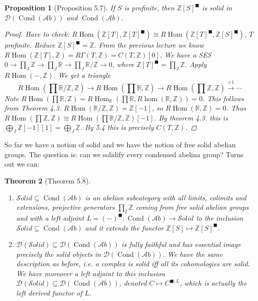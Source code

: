 \documentclass[12pt]{article}
\theoremstyle{darkgreentheorem}
\newtheorem{thm}{Theorem}[section]
\newtheorem{prop}[thm]{Proposition}
\theoremstyle{darkbluedefinition}
\theoremstyle{darkredexample}
\theoremstyle{remark}
\newcommand{\Z}{\mathbb{Z}}
\newcommand{\R}{\mathbb{R}}
\newcommand{\1}{\mathbbm{1}}
\newcommand{\Ab}{\mathscr{A}b}
\newcommand{\D}{\mathscr{D}}
\newcommand{\Solid}{\mathscr{S}olid}
\DeclareMathOperator{\Hom}{Hom}
\DeclareMathOperator{\Cond}{Cond}
\newcommand{\sub}{\subseteq}
\newcommand{\solid}{^{\blacksquare}}
\begin{document}
\begin{prop}[Proposition 5.7]
    If $S$ is profinite, then $\Z[S]\solid$ is solid in $\D(\Cond(\Ab))$ and $\Cond(\Ab)$.
    \begin{proof}
	Have to check: $R\Hom(\Z[T],\Z[T]\solid)\cong R\Hom(\Z[T]\solid,\Z[S]\solid)$, $T$ profinite.
	Reduce $\Z[S]\solid =\Z$.
	From the previous lecture we know $R\Hom(\Z[T],\Z)=R\Gamma (T,\Z)=C(T,\Z)[0]$.
	We have a SES $0\to \prod_{J}\Z\to \prod_{J}\R\to \prod_{J}\R/\Z\to 0$, where $\Z[T]\solid =\prod_{J}\Z$.
	Apply $R\Hom(-,\Z)$.
	We get a triangle
	\[R\Hom(\prod \R/\Z,\Z)\to R\Hom(\prod \R,\Z)\to R\Hom(\prod \Z,\Z)\xrightarrow{+1}\cdots\]
	Note $R\Hom(\prod \R,\Z)=R\Hom_{\R}(\prod \R, R\hom(\R,\Z))=0$.
	This follows from Theorem 4.3. $R\Hom(\R/\Z,\Z)=\Z[-1]$, so $R\Hom(\R,\Z)=0$.
	Thus $R\Hom(\prod\Z,\Z)\cong R\Hom(\prod \R/\Z,\Z)[-1]$.
	By theorem 4.3. this is $\bigoplus_{J}\Z[-1][1]=\bigoplus_{J}\Z$.
	By 5.4 this is precisely $C(T,\Z)$.
    \end{proof}
\end{prop}

So far we have a notion of solid and we have the notion of free solid abelian groups.
The question is: can we solidify every condensed abelina group?
Turns out we can:

\begin{thm}[Theorem 5.8]
    \begin{enumerate}[label=\roman*)]
	\item $\Solid\sub \Cond(\Ab)$ is an abelian subcategory with all limits, colimits and extensions, projective generators $\prod_{I}\Z$ coming from free solid abelian groups and with a left adjoint $L=(-)\solid\colon \Cond(\Ab)\to \Solid$ to the inclusion $\Solid \sub \Cond(\Ab)$ and it extends the functor $\Z[S]\mapsto \Z[S]\solid$.
	\item $\D(\Solid)\sub \D(\Cond(\Ab))$ is fully faithful and has essential image precisely the solid objects in $\D(\Cond(\Ab))$.
	    We have the same description as before, i.e. a complex is solid iff all its cohomologies are solid.
	    We have moreover a left adjoint to this inclusion $\D(\Solid)\sub \D(\Cond(\Ab))$, denoted $C\mapsto C^{\blacksquare, L}$, which is actually the left derived functor of $L$.
    \end{enumerate}
\end{thm}
\end{document}
